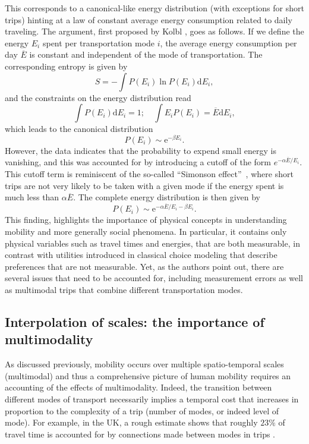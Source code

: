 This corresponds to a canonical-like energy distribution (with exceptions for short trips) hinting at a law of constant average energy consumption related to daily traveling. The argument, first proposed by Kolbl \et\cite{kolbl_2003_energy},  goes as follows.
If we define the energy $E_i$ spent per transportation mode $i$, the average energy consumption per day $\overline{E}$ is constant and independent of the mode of transportation. The corresponding 
entropy is given by
\begin{equation}
S=-\int P(E_i)\ln P(E_i)\mathrm{d}E_i,
\end{equation}
and the constraints on the energy distribution read
\begin{equation}
\int P(E_i)\mathrm{d}E_i =1; \quad \int E_iP(E_i) =\overline{E}\mathrm{d}E_i,
\end{equation}
which leads to the canonical distribution
\begin{equation}
P(E_i)\sim \mathrm{e}^{-\beta E_i}.
\end{equation}
%
However, the data indicates that the probability to expend small energy is vanishing, and this was accounted for by introducing a cutoff of the form $e^{-\alpha\overline{E}/E_i}$. This cutoff term is reminiscent of the so-called ``Simonson effect''~\cite{hettinger_1989}, where short trips are not very likely to be taken with a given mode if the energy spent is much less than $\alpha \overline{E}$. The complete energy distribution is then given by
\begin{equation}
P(E_i)\sim \mathrm{e}^{-\alpha\overline{E}/E_i-\beta E_i}.
\label{eq:energyrescaled}
\end{equation}
%
This finding, highlights the importance of physical concepts in understanding mobility and more generally social phenomena. In particular, it contains only physical variables such as travel times and energies, that are both measurable, in contrast with utilities introduced in classical choice modeling that describe preferences that are not measurable.  Yet, as the authors point out, there are several issues that need to be accounted for, including measurement errors as well as multimodal trips that combine different transportation modes. 

\subsection{Interpolation of scales: the importance of multimodality}
\label{sec:multimodal}

As discussed previously, mobility occurs over multiple spatio-temporal scales (multimodal) and thus a comprehensive picture of human mobility requires an accounting of the effects of multimodality. Indeed, the transition between different modes of transport necessarily implies a temporal cost that increases in proportion to the complexity of a trip (number of modes, or indeed level of mode). For example, in the UK, a rough estimate shows that roughly $23\%$ of travel time is accounted for by connections made between modes in trips \cite{gallotti_2014_anatomy}.

